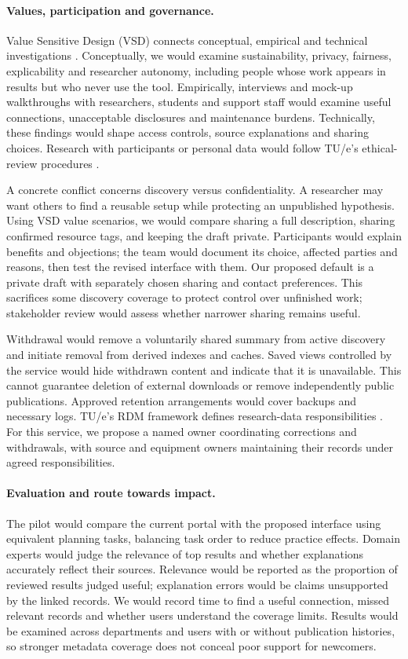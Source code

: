 \documentclass[11pt,a4paper]{article}
\begin{document}
\paragraph{Values, participation and governance.}
Value Sensitive Design (VSD) connects conceptual, empirical and technical investigations \citep{friedman2008,vsdlab}. Conceptually, we would examine sustainability, privacy, fairness, explicability and researcher autonomy, including people whose work appears in results but who never use the tool. Empirically, interviews and mock-up walkthroughs with researchers, students and support staff would examine useful connections, unacceptable disclosures and maintenance burdens. Technically, these findings would shape access controls, source explanations and sharing choices. Research with participants or personal data would follow TU/e's ethical-review procedures \citep{tueethics}.

A concrete conflict concerns discovery versus confidentiality. A researcher may want others to find a reusable setup while protecting an unpublished hypothesis. Using VSD value scenarios, we would compare sharing a full description, sharing confirmed resource tags, and keeping the draft private. Participants would explain benefits and objections; the team would document its choice, affected parties and reasons, then test the revised interface with them. Our proposed default is a private draft with separately chosen sharing and contact preferences. This sacrifices some discovery coverage to protect control over unfinished work; stakeholder review would assess whether narrower sharing remains useful.

Withdrawal would remove a voluntarily shared summary from active discovery and initiate removal from derived indexes and caches. Saved views controlled by the service would hide withdrawn content and indicate that it is unavailable. This cannot guarantee deletion of external downloads or remove independently public publications. Approved retention arrangements would cover backups and necessary logs. TU/e's RDM framework defines research-data responsibilities \citep{tuerdm}. For this service, we propose a named owner coordinating corrections and withdrawals, with source and equipment owners maintaining their records under agreed responsibilities.

\paragraph{Evaluation and route towards impact.}
The pilot would compare the current portal with the proposed interface using equivalent planning tasks, balancing task order to reduce practice effects. Domain experts would judge the relevance of top results and whether explanations accurately reflect their sources. Relevance would be reported as the proportion of reviewed results judged useful; explanation errors would be claims unsupported by the linked records. We would record time to find a useful connection, missed relevant records and whether users understand the coverage limits. Results would be examined across departments and users with or without publication histories, so stronger metadata coverage does not conceal poor support for newcomers.
\end{document}
